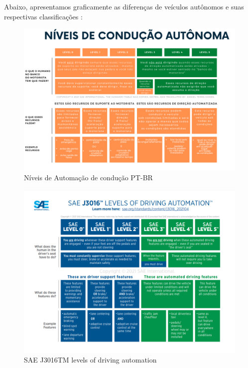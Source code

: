 Abaixo, apresentamos graficamente as diferenças de veículos autônomos e suas respectivas classificações \cite{SAE}:

\begin{figure}[H]
\centering
\includegraphics[width=\textwidth]{Figures/IC-Graph1.png}
\caption{Níveis de Automação de condução PT-BR}
\label{Graph_PT}
\end{figure}
\begin{figure}[H]
\centering
\includegraphics[width=\textwidth]{Figures/IC-GrapEN.png}
\caption{SAE J3016TM levels of driving automation}
\label{Graph_EN}
\end{figure}

